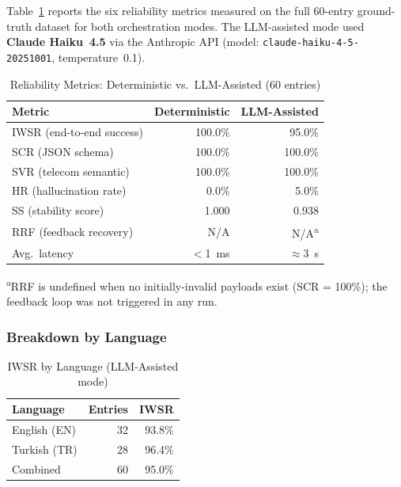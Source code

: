 \documentclass[conference]{IEEEtran}
\begin{document}
Table~\ref{tab:results} reports the six reliability metrics measured on the
full 60-entry ground-truth dataset for both orchestration modes.
The LLM-assisted mode used \textbf{Claude Haiku~4.5} via the Anthropic API
(model: \texttt{claude-haiku-4-5-20251001}, temperature~0.1).

\begin{table}[H]
\centering
\caption{Reliability Metrics: Deterministic vs.\ LLM-Assisted (60 entries)}
\label{tab:results}
\scriptsize
\begin{tabular}{lrr}
\toprule
\textbf{Metric} & \textbf{Deterministic} & \textbf{LLM-Assisted} \\
\midrule
IWSR (end-to-end success) & 100.0\% & 95.0\% \\
SCR  (JSON schema)         & 100.0\% & 100.0\% \\
SVR  (telecom semantic)    & 100.0\% & 100.0\% \\
HR   (hallucination rate)  &   0.0\% &   5.0\% \\
SS   (stability score)     &   1.000 &   0.938 \\
RRF  (feedback recovery)   &    N/A  &    N/A\textsuperscript{a} \\
Avg.\ latency              & $<$1~ms & $\approx$3~s \\
\bottomrule
\end{tabular}
\end{table}

\noindent\textsuperscript{a}RRF is undefined when no initially-invalid payloads exist (SCR = 100\%); the feedback loop was not triggered in any run.

\subsubsection{Breakdown by Language}

\begin{table}[H]
\centering
\caption{IWSR by Language (LLM-Assisted mode)}
\label{tab:lang}
\scriptsize
\begin{tabular}{lrr}
\toprule
\textbf{Language} & \textbf{Entries} & \textbf{IWSR} \\
\midrule
English (EN) & 32 & 93.8\% \\
Turkish (TR) & 28 & 96.4\% \\
\midrule
Combined     & 60 & 95.0\% \\
\bottomrule
\end{tabular}
\end{table}
\end{document}

